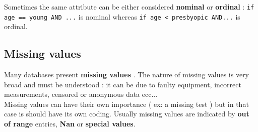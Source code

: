 Sometimes the same attribute can be either considered \textbf{nominal} or \textbf{ordinal} : \texttt{if age == young AND ...} is nominal whereas \texttt{if age < presbyopic AND...} is ordinal.\\

\subsection{Missing values}
Many databases present \textbf{missing values} . The nature of missing values is very broad and must be understood : it can be due to faulty equipment, incorrect measurements, censored or anonymous data  ecc...\\
Missing values can have their own importance ( ex: a missing test ) but in that case is should have its own coding.
Usually missing values are indicated by \textbf{out of range } entries, \textbf{Nan} or \textbf{special values}. 
